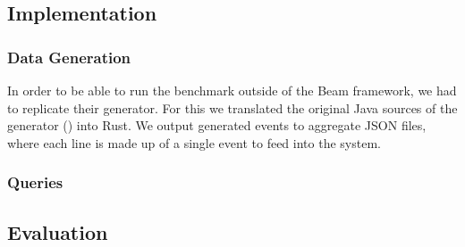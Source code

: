 
\subsection{Implementation}
\subsubsection{Data Generation}
In order to be able to run the benchmark outside of the Beam framework, we had to replicate their generator. For this we translated the original Java sources of the generator () into Rust. We output generated events to aggregate JSON files, where each line is made up of a single event to feed into the system. \\

\subsubsection{Queries}

\subsection{Evaluation}


